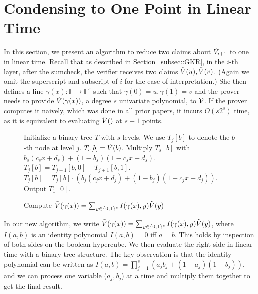 \section{Condensing to One Point in Linear Time}\label{app:onepoint}


In this section, we present an algorithm to reduce two claims about $\tilde{V}_{i+1}$ to one in linear time. Recall that as described in Section~\ref{subsec::GKR}, in the $i$-th layer, after the sumcheck, the verifier receives two claims $\tilde{V}(u), \tilde{V}(v)$. (Again we omit the superscript and subscript of $i$ for the ease of interpretation.) She then defines a line $\gamma(x): \mathbb{F}\rightarrow\mathbb{F}^{s}$ such that $\gamma(0) = u, \gamma(1)=v$ and the prover needs to provide $\tilde{V}(\gamma(x))$, a degree $s$ univariate polynomial, to $\mathcal{V}$. If the prover computes it naively, which was done in all prior papers, it incurs $O(s2^{s})$ time, as it is equivalent to evaluating $\tilde{V}()$ at $s+1$ points. 

\begin{figure}[t!]
	\begin{algorithm}[H]
		\label{alg::comb}
		\caption{Compute $\tilde{V}(\gamma(x)) = \sum_{y\in\{0,1\}^s}I(\gamma(x), y)\tilde{V}(y)$}
		\begin{algorithmic}[1]
			\State Initialize a binary tree $T$ with $s$ levels. We use $T_j[b]$ to denote the $b$-th node at level $j$.
				\State $T_s[b] = \tilde{V}(b)$.
				\State Multiply $T_s[b]$ with $b_s(c_s x+ d_s)+(1-b_s)(1-c_s x- d_s)$.
			\EndFor
					\State $T_j[b] = T_{j+1}[b,0]+T_{j+1}[b,1]$.
					\State $T_j[b] = T_j[b] \cdot (b_j(c_j x+ d_j)+(1-b_j)(1-c_j x- d_j))$. 
				\EndFor
			\EndFor
			\State Output $T_1[0]$.
		\end{algorithmic}
	\end{algorithm}
\end{figure}


In our new algorithm, we write $\tilde{V}(\gamma(x)) = \sum_{y\in\{0,1\}^s}I(\gamma(x), y)\tilde{V}(y)$, where $I(a,b)$ is an identity polynomial $I(a,b)=0$ iff $a=b$. This holds by inspection of both sides on the boolean hypercube. We then evaluate the right side in linear time with a binary tree structure. The key observation is that the identity polynomial can be written as $I(a,b) = \prod_{j=1}^s (a_jb_j+(1-a_j)(1-b_j))$, and we can process one variable ($a_j,b_j$) at a time and multiply them together to get the final result. 

